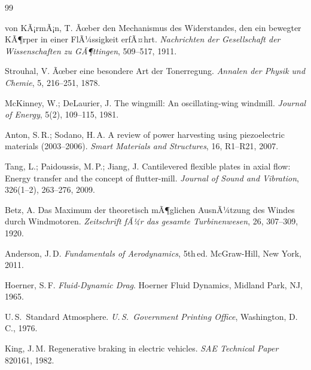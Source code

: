 ﻿\documentclass[12pt, a4paper]{report}
\theoremstyle{definition}
\theoremstyle{remark}
\begin{document}
\begin{thebibliography}{99}

  von KÃ¡rmÃ¡n, T.
  Ãœber den Mechanismus des Widerstandes, den ein bewegter KÃ¶rper in einer
  FlÃ¼ssigkeit erfÃ¤hrt.
  \textit{Nachrichten der Gesellschaft der Wissenschaften zu GÃ¶ttingen}, 509--517, 1911.

  Strouhal, V.
  Ãœber eine besondere Art der Tonerregung.
  \textit{Annalen der Physik und Chemie}, 5, 216--251, 1878.

  McKinney, W.; DeLaurier, J.
  The wingmill: An oscillating-wing windmill.
  \textit{Journal of Energy}, 5(2), 109--115, 1981.

  Anton, S.\,R.; Sodano, H.\,A.
  A review of power harvesting using piezoelectric materials (2003--2006).
  \textit{Smart Materials and Structures}, 16, R1--R21, 2007.

  Tang, L.; Paidoussis, M.\,P.; Jiang, J.
  Cantilevered flexible plates in axial flow: Energy transfer and the
  concept of flutter-mill.
  \textit{Journal of Sound and Vibration}, 326(1--2), 263--276, 2009.

  Betz, A.
  Das Maximum der theoretisch mÃ¶glichen AusnÃ¼tzung des Windes durch Windmotoren.
  \textit{Zeitschrift fÃ¼r das gesamte Turbinenwesen}, 26, 307--309, 1920.

  Anderson, J.\,D.
  \textit{Fundamentals of Aerodynamics}, 5th\,ed.
  McGraw-Hill, New York, 2011.

  Hoerner, S.\,F.
  \textit{Fluid-Dynamic Drag}.
  Hoerner Fluid Dynamics, Midland Park, NJ, 1965.

  U.\,S.\ Standard Atmosphere.
  \textit{U.\,S.\ Government Printing Office}, Washington, D.\,C., 1976.

  King, J.\,M.
  Regenerative braking in electric vehicles.
  \textit{SAE Technical Paper} 820161, 1982.


\end{thebibliography}
\end{document}
